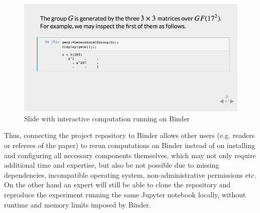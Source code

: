 \begin{figure}[!ht]
    \centering
    \includegraphics[width=13.5cm]{images/unipoly-slide}
    \caption{Slide with interactive computation running on Binder}
    \label{fig:unipoly-slide}
\end{figure}

Thus, connecting the project repository to Binder allows other users
(e.g. readers or referees of the paper) to rerun computations on Binder
instead of on installing and configuring all necessary components 
themselves, which may not only require additional time and expertise,
but also be not possible due to missing dependencies, incompatible
operating system, non-administrative permissions etc. On the other 
hand an expert will still be able to clone the repository and 
reproduce the experiment running the same Jupyter notebook locally,
without runtime and memory limits imposed by Binder.
